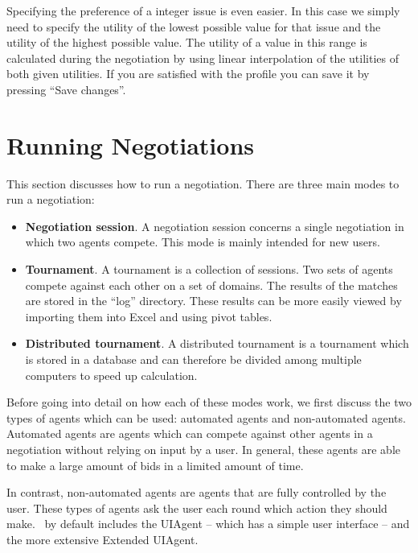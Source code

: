\documentclass[]{article}
\begin{document}
Specifying the preference of a integer issue is even easier. In this case we simply need to specify the utility of the lowest possible value for that issue and the utility of the highest possible value. The utility of a value in this range is calculated during the negotiation by using linear interpolation of the utilities of both given utilities. If you are satisfied with the profile you can save it by pressing ``Save changes''. 

\section{Running Negotiations}
This section discusses how to run a negotiation. There are three main modes to run a negotiation:

\begin{itemize}
	\item \textbf{Negotiation session}. A negotiation session concerns a single negotiation in which two agents compete. This mode is mainly intended for new users.
	\item \textbf{Tournament}. A tournament is a collection of sessions. Two sets of agents compete against each other on a set of domains. The results of the matches are stored in the ``log'' directory. These results can be more easily viewed by importing them into Excel and using pivot tables.
	\item \textbf{Distributed tournament}. A distributed tournament is a tournament which is stored in a database and can therefore be divided among multiple computers to speed up calculation.
\end{itemize}

Before going into detail on how each of these modes work, we first discuss the two types of agents which can be used: automated agents and non-automated agents. Automated agents are agents which can compete against other agents in a negotiation without relying on input by a user. In general, these agents are able to make a large amount of bids in a limited amount of time.

In contrast, non-automated agents are agents that are fully controlled by the user. These types of agents ask the user each round which action they should make. \Genius~by default includes the UIAgent -- which has a simple user interface -- and the more extensive Extended UIAgent.
\end{document}
